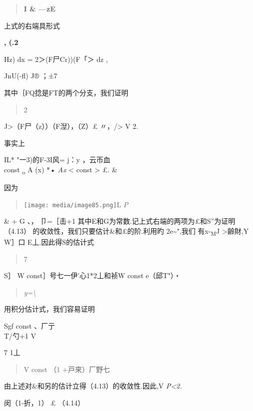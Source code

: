 \documentclass{article}
\begin{document}
\begin{quote}
\textbf{I \& ---z\textbar{}E}
\end{quote}

上式的右端具形式

\textbf{, (.2}

Hz) dx = 2＞(F尸Cr))(F「＞ dz ,

JnU(-fl) J® ；±7

其中｛FQ捻是FT的两个分支，我们证明

\begin{quote}
2
\end{quote}

J\textgreater{}（F尸（z））（F湼），（Z）£ 〃，/\textgreater{} V 2.

事实上

IL* "一3)的F-3I风= j：\textbar{}y \textbar{}，云帀血\\
const \textbar{}\textsubscript{o} \textbar{} A (x) \textbar{} *•
\emph{Ax} \textless{} const \textgreater{} £. \&

因为

\begin{quote}
\texttt{[image: media/image85.png]}L
\emph{P}
\end{quote}

\& + G 、， 卩=［击+1
其中E和G为常数.记上式右端的两项为£和S''为证明（4.13）
的收敛性，我们只要估计\&和£的阶.利用\textbar{}旳\textbar{}
2e\textasciitilde{}",我们 有\textbar{}x-\textsubscript{M}J
\textgreater{}齢財,Y W］口 E丄.因此得S的估计式

\begin{quote}
7
\end{quote}

S］ W const］号七一伊'\textbar{}心1*2丄和祯W const e（邱T"）・

\begin{quote}
\emph{y=\textbackslash{}}
\end{quote}

用积分估计式，我们容易证明

Sgf const 、厂亍\\
T/勺+1 V

7 1丄

\begin{quote}
V const （1 +戸來）厂野七
\end{quote}

由上述对\&和另的估计立得（4.13）的收敛性.因此,V \emph{P\textless{}2.}

闵（1-折，1） £ （4.14）
\end{document}
